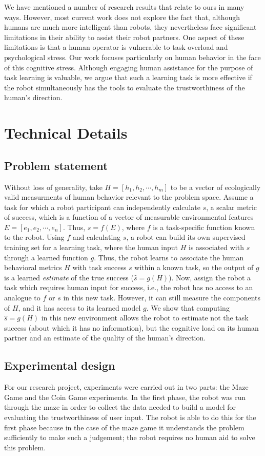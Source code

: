 \documentclass{sig-alternate}
\begin{document}
We have mentioned a number of research results that relate to ours in
many ways.  However, most current work does not explore the fact that,
although humans are much more intelligent than robots, they
nevertheless face significant limitations in their ability to assist
their robot partners.  One aspect of these limitations is that a human
operator is vulnerable to task overload and psychological stress.  Our
work focuses particularly on human behavior in the face of this
cognitive stress.  Although engaging human assistance for the purpose
of task learning is valuable, we argue that such a learning task is
more effective if the robot simultaneously has the tools to evaluate
the trustworthiness of the human's direction.

\section{Technical Details}
\subsection{Problem statement}
Without loss of generality, take $H=[h_1,h_2,\cdots,h_m]$ to be a
vector of ecologically valid measurments of human behavior relevant to
the problem space.  Assume a task for which a robot participant can
independently calculate $s$, a scalar metric of success, which is a
function of a vector of measurable environmental features
$E=[e_1,e_2,\cdots,e_n]$.  Thus, $s = f(E)$, where $f$ is a
task-specific function known to the robot.  Using $f$ and calculating
$s$, a robot can build its own supervised training set for a learning
task, where the human input $H$ is associated with $s$ through a
learned function $g$.  Thus, the robot learns to associate the human
behavioral metrics $H$ with task success $s$ within a known task, so
the output of $g$ is a learned \emph{estimate} of the true success
($\hat{s}=g(H)$).  Now, assign the robot a task which requires human
input for success, i.e., the robot has no access to an analogue to $f$
or $s$ in this new task.  However, it can still measure the components
of $H$, and it has access to its learned model $g$.  We show that
computing $\hat{s}=g(H)$ in this new environment allows the robot to
estimate not the task success (about which it has no information), but
the cognitive load on its human partner and an estimate of the quality
of the human's direction.
\subsection{Experimental design}
For our research project, experiments were carried out in two parts:
the Maze Game and the Coin Game experiments. In the first phase, the
robot was run through the maze in order to collect the data needed to
build a model for evaluating the trustworthiness of user input. The
robot is able to do this for the first phase because in the case of
the maze game it understands the problem sufficiently to make such a
judgement; the robot requires no human aid to solve this problem.
\end{document}
